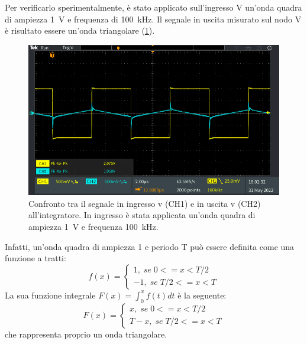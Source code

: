 Per verificarlo sperimentalmente, è stato applicato sull'ingresso V un'onda quadra di ampiezza \SI{1}{\volt} e frequenza di \SI{100}{\kilo\hertz}. Il segnale in uscita misurato sul nodo V è risultato essere un'onda triangolare (\Fig\ref{fig:opamp_int_quadra}).
\begin{figure}[h!]
	\centering
	\includegraphics[width=1\linewidth]{./ImageFiles/Laboratorio 4/TEK00016}
	\caption{Confronto tra il segnale in ingresso v (CH1)  e in uscita v (CH2) all'integratore. In ingresso è stata applicata un'onda quadra di ampiezza \SI{1}{\volt} e frequenza \SI{100}{\kilo\hertz}.}
	\label{fig:opamp_int_quadra}
\end{figure}

\noindent
Infatti, un'onda quadra di ampiezza 1 e periodo T può essere definita come una funzione a tratti:
\begin{equation}
	f(x)=
	\begin{cases}
		1,\;se\;0<=x<T/2 \\
		-1,\;se\;T/2<=x<T 
	\end{cases}
\end{equation}
La sua funzione integrale $F(x)=\int_0^xf(t)dt$ è la seguente:
\begin{equation}
	F(x)=
	\begin{cases}
		x,\;se\;0<=x<T/2 \\
		T-x,\;se\;T/2<=x<T 
	\end{cases}
\end{equation}
che rappresenta proprio un onda triangolare.